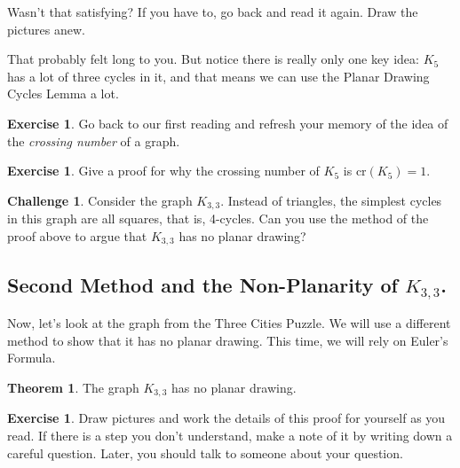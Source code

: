 \documentclass[12pt,letterpaper]{article}
\theoremstyle{definition}
\newtheorem{exercise}[question]{Exercise}
\newtheorem*{challenge}{Challenge}
\newtheorem{theorem}{Theorem}
\begin{document}
Wasn't that satisfying? If you have to, go back and read it again. Draw the pictures anew. 

That probably felt long to you. But notice there is really only one key idea: $K_5$ has a lot of three cycles in it, and that means we can use the Planar Drawing Cycles Lemma a lot.


\begin{exercise}
Go back to our first reading and refresh your memory of the idea of the \emph{crossing number} of a graph.
\end{exercise}

\begin{exercise}
Give a proof for why the crossing number of $K_5$ is $\mathrm{cr}(K_5) = 1$.
\end{exercise}


\begin{challenge}
Consider the graph $K_{3,3}$. Instead of triangles, the simplest cycles in this graph are all squares, that is, 4-cycles.
Can you use the method of the proof above to argue that $K_{3,3}$ has no planar drawing?
\end{challenge}


\clearpage

\subsection*{Second Method and the Non-Planarity of $K_{3,3}$.}


Now, let's look at the graph from the Three Cities Puzzle. We will use a different method to show that it has no planar drawing. This time, we will rely on Euler's Formula.

\begin{theorem}\label{thm:k33}
The graph $K_{3,3}$ has no planar drawing.
\end{theorem}

\begin{exercise}
Draw pictures and work the details of this proof for yourself as you read. 
If there is a step you don't understand, make a note of it by writing down a careful question.
Later, you should talk to someone about your question.
\end{exercise}
\end{document}
